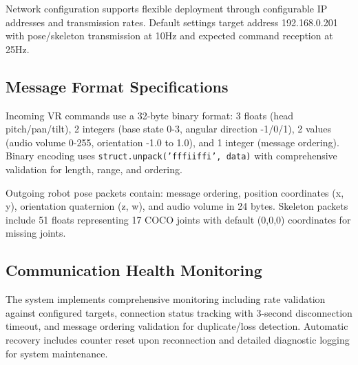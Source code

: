 Network configuration supports flexible deployment through configurable IP addresses and transmission rates. Default settings target address 192.168.0.201 with pose/skeleton transmission at 10Hz and expected command reception at 25Hz.

\subsection{Message Format Specifications}

Incoming VR commands use a 32-byte binary format: 3 floats (head pitch/pan/tilt), 2 integers (base state 0-3, angular direction -1/0/1), 2 values (audio volume 0-255, orientation -1.0 to 1.0), and 1 integer (message ordering). Binary encoding uses \texttt{struct.unpack('fffiiffi', data)} with comprehensive validation for length, range, and ordering.

Outgoing robot pose packets contain: message ordering, position coordinates (x, y), orientation quaternion (z, w), and audio volume in 24 bytes. Skeleton packets include 51 floats representing 17 COCO joints with default (0,0,0) coordinates for missing joints.

\subsection{Communication Health Monitoring}

The system implements comprehensive monitoring including rate validation against configured targets, connection status tracking with 3-second disconnection timeout, and message ordering validation for duplicate/loss detection. Automatic recovery includes counter reset upon reconnection and detailed diagnostic logging for system maintenance.
